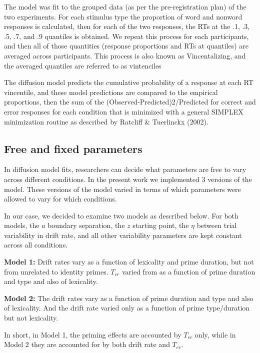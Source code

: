 \documentclass[
  english,
  man]{apa6}
\begin{document}
\begin{appendix}
The model was fit to the grouped data (as per the pre-registration plan)
of the two experiments. For each stimulus type the proportion of word
and nonword responses is calculated, then for each of the two responses,
the RTs at the .1, .3, .5, .7, and .9 quantiles is obtained. We repeat
this process for each participants, and then all of those quantities
(response proportions and RTs at quantiles) are averaged across
participants. This process is also known as Vincentalizing, and the
averaged quantiles are referred to as vintenciles

The diffusion model predicts the cumulative probability of a response at
each RT vincentile, and these model predictions are compared to the
empirical proportions, then the sum of the
(Observed-Predicted)2/Predicted for correct and error responses for each
condition that is minimized with a general SIMPLEX minimization routine
as described by Ratcliff \& Tuerlinckx (2002).

\hypertarget{free-and-fixed-parameters}{%
\subsection{Free and fixed parameters}\label{free-and-fixed-parameters}}

In diffusion model fits, researchers can decide what parameters are free
to vary across different conditions. In the present work we implemented
3 versions of the model. These versions of the model varied in terms of
which parameters were allowed to vary for which conditions.

In our case, we decided to examine two models as described below. For
both models, the \(a\) boundary separation, the \(z\) starting point,
the \(\eta\) between trial variability in drift rate, and all other
variability parameters are kept constant across all conditions.

\textbf{Model 1:} Drift rates vary as a function of lexicality and prime
duration, but not from unrelated to identity primes. \(T_{er}\) varied
from as a function of prime duration and type and also of lexicality.

\textbf{Model 2:} The drift rates vary as a function of prime duration
and type and also of lexicality. And the drift rate varied only as a
function of prime type/duration but not lexicality.

In short, in Model 1, the priming effects are accounted by \(T_{er}\)
only, while in Model 2 they are accounted for by both drift rate and
\(T_{er}\).


\end{appendix}
\end{document}
